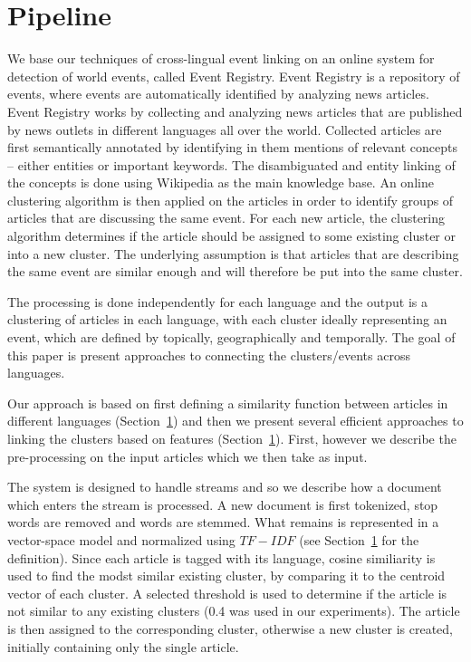 \documentclass[twoside,11pt]{article}
\begin{document}
\section{Pipeline}

We base our techniques of cross-lingual event linking on an online system for detection of world events, called Event Registry\cite{}. Event Registry is a repository of events, where events are automatically identified by analyzing news articles.  Event Registry works by collecting and analyzing news articles that are published by news outlets in different languages all over the world. Collected articles are first semantically annotated by identifying in them mentions of relevant concepts -- either entities or important keywords. The disambiguated and entity linking of the concepts is done using Wikipedia as the main knowledge base. An online clustering algorithm is then applied on the articles in order to identify groups of articles that are discussing the same event. For each new article, the clustering algorithm determines if the article should be assigned to some existing cluster or into a new cluster. The underlying assumption is that articles that are describing the same event are similar enough and will therefore be put into the same cluster.

The processing is done independently for each language and the output is a clustering of articles in each language, with each cluster ideally representing an event, which are defined by topically, geographically and temporally. The goal of this paper is present approaches to  connecting the clusters/events across languages.

Our approach is based on first defining a similarity function between articles in different languages (Section~\ref{}) and then we present several efficient approaches to linking the clusters based on features (Section~\ref{}). First, however we describe the pre-processing on the input articles which we then take as input.  

The system is designed to handle streams and so we describe how a document which enters the stream is processed.   A new document is first tokenized, stop words are removed and words are stemmed. 
 What remains is represented in a vector-space model and normalized using $TF-IDF$ (see Section~\ref{} for the definition). Since each article is tagged with its language, cosine similiarity  is used to find the modst similar existing cluster, by comparing it to the centroid vector of each cluster. A selected threshold is used to determine if the article is not similar to any existing clusters (0.4 was used in our experiments).  The article is then assigned to the corresponding cluster, otherwise a new cluster is created, initially containing only the single article.
 
\end{document}
